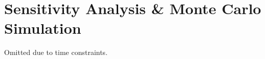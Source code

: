 \section{Sensitivity Analysis \& Monte Carlo Simulation}\label{sec:sensitivity_analysis}
Omitted due to time constraints.
